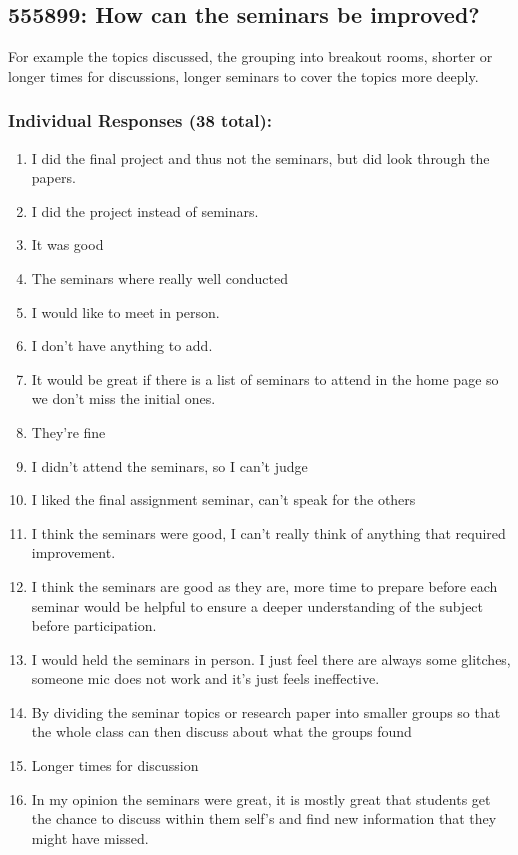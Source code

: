 \documentclass[a4paper]{report}
\begin{document}
\subsection{555899: How can the seminars be improved?}

For example the topics discussed, the grouping into breakout rooms, shorter or 
longer times for discussions, longer seminars to cover the topics more deeply.

\subsubsection{Individual Responses (38 total):}

\begin{enumerate}
  \item I did the final project and thus not the seminars, but did look through the papers.
  \item I did the project instead of seminars. 
  \item It was good
  \item The seminars where really well conducted
  \item I would like to meet in person.
  \item I don't have anything to add.
  \item It would be great if there is a list of seminars to attend in the home page so we don't miss the initial ones.
  \item They're fine
  \item I didn't attend the seminars, so I can't judge
  \item I liked the final assignment seminar, can’t speak for the others
  \item I think the seminars were good, I can't really think of anything that required improvement. 
  \item I think the seminars are good as they are, more time to prepare before each seminar would be helpful to ensure a deeper understanding of the subject before participation.
  \item I would held the seminars in person. I just feel there are always some glitches, someone mic does not work and it's just feels ineffective.
  \item By dividing the seminar topics or research paper into smaller groups so that the whole class can then discuss about what the groups found 
  \item Longer times for discussion
  \item In my opinion the seminars were great, it is mostly great that students get the chance to discuss within them self's and find new information that they might have missed.

\end{enumerate}
\end{document}
